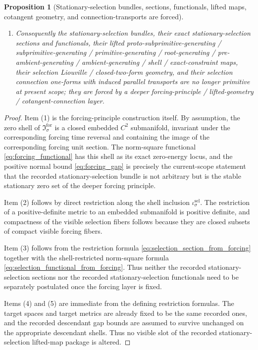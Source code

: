 \documentclass[11pt]{article}
\newcommand{\SelInc}[1]{\iota_{#1}^{\mathrm{sel}}}
\newcommand{\ForSection}[1]{\mathfrak I_{#1}^{\mathrm{for}}}
\newtheorem{proposition}{Proposition}
\begin{document}
\begin{proposition}[Stationary-selection bundles, sections, functionals, lifted maps, cotangent geometry, and connection-transports are forced]
\begin{enumerate}
    \item Consequently the stationary-selection bundles, their exact stationary-selection sections and functionals, their lifted proto-subprimitive-generating / subprimitive-generating / primitive-generating / root-generating / pre-ambient-generating / ambient-generating / shell / exact-constraint maps, their selection Liouville / closed-two-form geometry, and their selection connection one-forms with induced parallel transports are no longer primitive at present scope; they are forced by a deeper forcing-principle / lifted-geometry / cotangent-connection layer.
\end{enumerate}
\end{proposition}

\begin{proof}
Item (1) is the forcing-principle construction itself. By assumption, the zero shell of \(\ForSection{\sigma}\) is a closed embedded \(C^2\) submanifold, invariant under the corresponding forcing time reversal and containing the image of the corresponding forcing unit section. The norm-square functional \eqref{eq:forcing_functional} has this shell as its exact zero-energy locus, and the positive normal bound \eqref{eq:forcing_gap} is precisely the current-scope statement that the recorded stationary-selection bundle is not arbitrary but is the stable stationary zero set of the deeper forcing principle.

Item (2) follows by direct restriction along the shell inclusion \(\SelInc{\sigma}\). The restriction of a positive-definite metric to an embedded submanifold is positive definite, and compactness of the visible selection fibers follows because they are closed subsets of compact visible forcing fibers.

Item (3) follows from the restriction formula \eqref{eq:selection_section_from_forcing} together with the shell-restricted norm-square formula \eqref{eq:selection_functional_from_forcing}. Thus neither the recorded stationary-selection sections nor the recorded stationary-selection functionals need to be separately postulated once the forcing layer is fixed.

Items (4) and (5) are immediate from the defining restriction formulas. The target spaces and target metrics are already fixed to be the same recorded ones, and the recorded descendant gap bounds are assumed to survive unchanged on the appropriate descendant shells. Thus no visible slot of the recorded stationary-selection lifted-map package is altered.


\end{proof}
\end{document}
